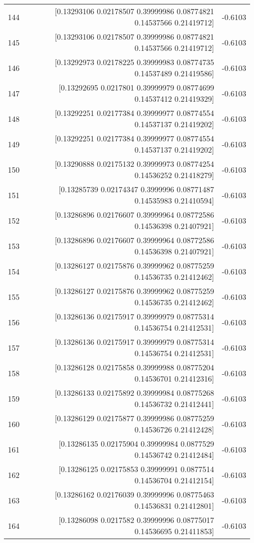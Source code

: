 \begin{longtable}{lrr}
144 & [0.13293106 0.02178507 0.39999986 0.08774821 0.14537566 0.21419712] & -0.6103 \\
145 & [0.13293106 0.02178507 0.39999986 0.08774821 0.14537566 0.21419712] & -0.6103 \\
146 & [0.13292973 0.02178225 0.39999983 0.08774735 0.14537489 0.21419586] & -0.6103 \\
147 & [0.13292695 0.0217801  0.39999979 0.08774699 0.14537412 0.21419329] & -0.6103 \\
148 & [0.13292251 0.02177384 0.39999977 0.08774554 0.14537137 0.21419202] & -0.6103 \\
149 & [0.13292251 0.02177384 0.39999977 0.08774554 0.14537137 0.21419202] & -0.6103 \\
150 & [0.13290888 0.02175132 0.39999973 0.08774254 0.14536252 0.21418279] & -0.6103 \\
151 & [0.13285739 0.02174347 0.3999996  0.08771487 0.14535983 0.21410594] & -0.6103 \\
152 & [0.13286896 0.02176607 0.39999964 0.08772586 0.14536398 0.21407921] & -0.6103 \\
153 & [0.13286896 0.02176607 0.39999964 0.08772586 0.14536398 0.21407921] & -0.6103 \\
154 & [0.13286127 0.02175876 0.39999962 0.08775259 0.14536735 0.21412462] & -0.6103 \\
155 & [0.13286127 0.02175876 0.39999962 0.08775259 0.14536735 0.21412462] & -0.6103 \\
156 & [0.13286136 0.02175917 0.39999979 0.08775314 0.14536754 0.21412531] & -0.6103 \\
157 & [0.13286136 0.02175917 0.39999979 0.08775314 0.14536754 0.21412531] & -0.6103 \\
158 & [0.13286128 0.02175858 0.39999988 0.08775204 0.14536701 0.21412316] & -0.6103 \\
159 & [0.13286133 0.02175892 0.39999984 0.08775268 0.14536732 0.21412441] & -0.6103 \\
160 & [0.13286129 0.02175877 0.39999986 0.08775259 0.14536726 0.21412428] & -0.6103 \\
161 & [0.13286135 0.02175904 0.39999984 0.0877529  0.14536742 0.21412484] & -0.6103 \\
162 & [0.13286125 0.02175853 0.39999991 0.0877514  0.14536704 0.21412154] & -0.6103 \\
163 & [0.13286162 0.02176039 0.39999996 0.08775463 0.14536831 0.21412801] & -0.6103 \\
164 & [0.13286098 0.0217582  0.39999996 0.08775017 0.14536695 0.21411853] & -0.6103 \\

\end{longtable}
